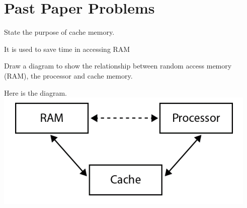 \section{Past Paper Problems}

\begin{exercise} %
	State the purpose of cache memory.
	\begin{solution}
		It is used to save time in accessing RAM
	\end{solution}
\end{exercise}
	
\begin{exercise} %
Draw a diagram to show the relationship between random access memory (RAM), the processor and cache memory.
\begin{solution}
	Here is the diagram.\\
	\includegraphics[scale=0.5]{topic_1_systems/topic_1_exercises/RAMdiagram}	
\end{solution}
\end{exercise}

